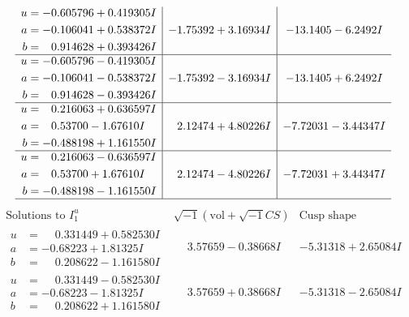 \documentclass[1p]{elsarticle_modified}
\theoremstyle{definition}
\newcommand{\I}{\sqrt{-1}}
\begin{document}
$$\begin{array}{c|c|c}
\begin{aligned}
u &= -0.605796 + 0.419305 I \\
a &= -0.106041 + 0.538372 I \\
b &= \phantom{-}0.914628 + 0.393426 I\end{aligned}
 & -1.75392 + 3.16934 I & -13.1405 - 6.2492 I \\ \hline\begin{aligned}
u &= -0.605796 - 0.419305 I \\
a &= -0.106041 - 0.538372 I \\
b &= \phantom{-}0.914628 - 0.393426 I\end{aligned}
 & -1.75392 - 3.16934 I & -13.1405 + 6.2492 I \\ \hline\begin{aligned}
u &= \phantom{-}0.216063 + 0.636597 I \\
a &= \phantom{-}0.53700 - 1.67610 I \\
b &= -0.488198 + 1.161550 I\end{aligned}
 & \phantom{-}2.12474 + 4.80226 I & -7.72031 - 3.44347 I \\ \hline\begin{aligned}
u &= \phantom{-}0.216063 - 0.636597 I \\
a &= \phantom{-}0.53700 + 1.67610 I \\
b &= -0.488198 - 1.161550 I\end{aligned}
 & \phantom{-}2.12474 - 4.80226 I & -7.72031 + 3.44347 I\\
 \hline 
 \end{array}$$\newpage$$\begin{array}{c|c|c}  
\text{Solutions to }I^u_{1}& \I (\text{vol} + \sqrt{-1}CS) & \text{Cusp shape}\\
 \hline 
\begin{aligned}
u &= \phantom{-}0.331449 + 0.582530 I \\
a &= -0.68223 + 1.81325 I \\
b &= \phantom{-}0.208622 - 1.161580 I\end{aligned}
 & \phantom{-}3.57659 - 0.38668 I & -5.31318 + 2.65084 I \\ \hline\begin{aligned}
u &= \phantom{-}0.331449 - 0.582530 I \\
a &= -0.68223 - 1.81325 I \\
b &= \phantom{-}0.208622 + 1.161580 I\end{aligned}
 & \phantom{-}3.57659 + 0.38668 I & -5.31318 - 2.65084 I \\ \hline\begin{aligned}

\end{aligned}
\end{array}$$
\end{document}
